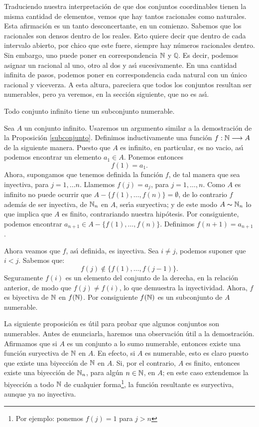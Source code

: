 Traduciendo nuestra interpretaci\'on de que dos conjuntos
coordinables tienen la misma cantidad de elementos, vemos que hay
tantos racionales como naturales. Esta afirmaci\'on es un tanto
desconcertante, en un comienzo. Sabemos que los racionales son
densos dentro de los reales. Esto quiere decir que dentro de cada
intervalo abierto, por chico que este fuere, siempre hay n\'umeros
racionales dentro. Sin embargo, uno puede poner en correspondencia
$\nn$ y $\mathbb{Q}$. Es decir, podemos asignar un racional al
uno, otro al dos y as\'{\i} sucesivamente. En una cantidad
infinita de pasos, podemos poner en correspondencia cada natural
con un \'unico racional y viceverza. A esta altura, pareciera que
todos los conjuntos resultan ser numerables, pero ya veremos, en
la secci\'on siguiente, que no es as\'{\i}.


\begin{lema}\label{subconjnum} Todo conjunto infinito tiene un
subconjunto numerable.
\end{lema}

\begin{demo} Sea $A$ un conjunto infinito. Usaremos un argumento similar a la demostraci\'on de
la Proposici\'on \vref{subconjunto}. Definimos inductivamente una
funci\'on $f:\nn\longrightarrow A$  de la siguiente manera. Puesto
que $A$ es infinito, en particular, es no vacio, as\'{\i} podemos
encontrar un elemento $a_1\in A$. Ponemos entonces
\[f(1)=a_1.\]
Ahora, supongamos que tenemos definida la funci\'on $f$, de tal
manera que sea inyectiva, para $j=1,\dots n$. Llamemos $f(j)=a_j$,
para $j=1,\dots , n$. Como $A$ es infinito no puede ocurrir que
$A-\{f(1),\dots,f(n)\}=\emptyset$, de lo contrario $f$ adem\'as de
ser inyectiva, de $\nn_n$ en $A$, ser\'{\i}a suryectiva; y de este
modo $A\thicksim\nn_n$ lo que implica que $A$ es finito,
contrariando nuestra hip\'otesis. Por consiguiente, podemos
encontrar $a_{n+1}\in A-\{f(1),\dots,f(n)\}$. Definimos
$f(n+1)=a_{n+1}$.

Ahora veamos que $f$, as\'{\i} definida, es inyectiva. Sea $i\neq
j $, podemos suponer que $i<j$. Sabemos que:
\[f(j)\notin \{f(1),\dots,f(j-1)\}.\]
Seguramente $f(i)$ es un elemento del conjunto de la derecha, en
la relaci\'on anterior, de modo que $f(j)\neq f(i)$, lo que
demuestra la inyectividad. Ahora, $f$ es biyectiva de $\nn$ en
$f(\nn)$. Por consiguiente $f(\nn)$ es un subconjunto de $A$
numerable.
\end{demo}

La siguiente proposici\'on es \'util para probar que algunos
conjuntos son numerables. Antes de enunciarla, haremos una
observaci\'on \'util a la demostraci\'on. Afirmamos que si $A$ es
un conjunto a lo sumo numerable, entonces existe una funci\'on
suryectiva de $\nn$ en $A$. En efecto, si $A$ es numerable, esto
es claro puesto que existe una biyecci\'on de $\nn$ en $A$. Si,
por el contrario, $A$ es finito, entonces existe una biyecci\'on
de $\nn_n$, para alg\'un $n\in\nn$, en $A$; en este caso
extendemos la biyecci\'on a todo $\nn$ de cualquier
forma\footnote{Por ejemplo: ponemos $f(j)=1$ para $j>n$}, la
funci\'on resultante es suryectiva, aunque ya no inyectiva.

